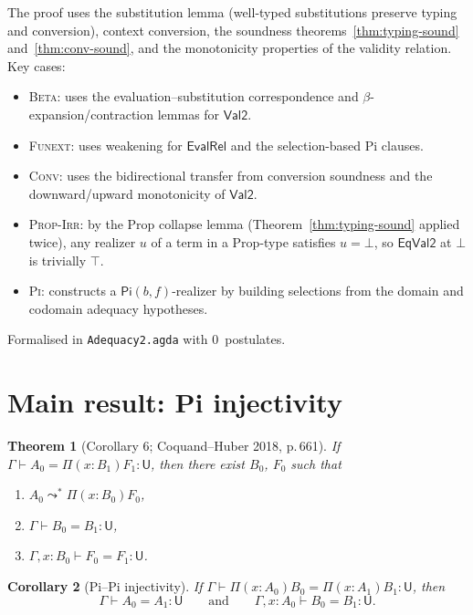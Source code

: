 \documentclass[11pt]{article}
\newcommand{\conveq}[4]{#1 \vdash #2 = #3 : #4}
\newcommand{\Pitype}[2]{\Pi(#1)#2}
\newcommand{\U}{\mathsf{U}}
\newcommand{\Bot}{\bot}
\newcommand{\PiC}[2]{\mathsf{Pi}(#1,#2)}
\newtheorem{theorem}{Theorem}
\newtheorem{corollary}[theorem]{Corollary}
\begin{document}
The proof uses the substitution lemma (well-typed substitutions
preserve typing and conversion), context conversion, the soundness
theorems~\ref{thm:typing-sound} and~\ref{thm:conv-sound},
and the monotonicity properties of the validity relation.
Key cases:
\begin{itemize}
  \item \textsc{Beta}: uses the evaluation--substitution
    correspondence and $\beta$-expansion/contraction lemmas for
    $\mathsf{Val2}$.
  \item \textsc{Funext}: uses weakening for
    $\mathsf{EvalRel}$ and the selection-based Pi clauses.
  \item \textsc{Conv}: uses the bidirectional transfer from
    conversion soundness and the downward/upward monotonicity
    of $\mathsf{Val2}$.
  \item \textsc{Prop-Irr}: by the Prop collapse lemma
    (Theorem~\ref{thm:typing-sound} applied twice), any
    realizer $u$ of a term in a Prop-type satisfies $u = \Bot$,
    so $\mathsf{EqVal2}$ at $\Bot$ is trivially $\top$.
  \item \textsc{Pi}: constructs a $\PiC{b}{f}$-realizer by
    building selections from the domain and codomain adequacy
    hypotheses.
\end{itemize}
Formalised in \texttt{Adequacy2.agda} with 0~postulates.

\section{Main result: Pi injectivity}

\begin{theorem}[Corollary 6; Coquand--Huber 2018, p.\,661]
  If\/ $\conveq{\Gamma}{A_0}{\Pitype{x{:}B_1}{F_1}}{\U}$,
  then there exist $B_0$, $F_0$ such that
  \begin{enumerate}
    \item $A_0 \leadsto^* \Pitype{x{:}B_0}{F_0}$,
    \item $\conveq{\Gamma}{B_0}{B_1}{\U}$,
    \item $\conveq{\Gamma, x{:}B_0}{F_0}{F_1}{\U}$.
  \end{enumerate}
\end{theorem}

\begin{corollary}[Pi--Pi injectivity]
  If\/ $\conveq{\Gamma}{\Pitype{x{:}A_0}{B_0}}{\Pitype{x{:}A_1}{B_1}}{\U}$,
  then
  \[
    \conveq{\Gamma}{A_0}{A_1}{\U}
    \qquad\text{and}\qquad
    \conveq{\Gamma, x{:}A_0}{B_0}{B_1}{\U}.
  \]
\end{corollary}
\end{document}
